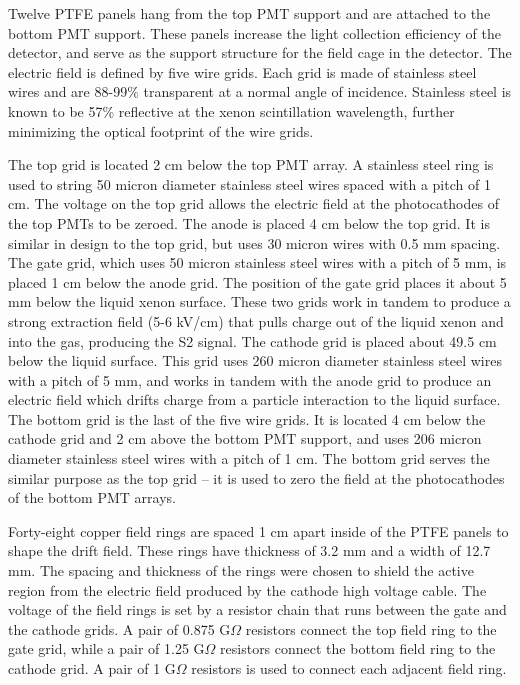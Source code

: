 Twelve PTFE panels hang from the top PMT support and are attached to the bottom PMT support.  These panels increase the light collection efficiency of the detector, and serve as the support structure for the field cage in the detector.  The electric field is defined by five wire grids.  Each grid is made of stainless steel wires and are 88-99\% transparent at a normal angle of incidence.  Stainless steel is known to be 57\% reflective at the xenon scintillation wavelength, further minimizing the optical footprint of the wire grids.

The top grid is located 2 cm below the top PMT array.  A stainless steel ring is used to string 50 micron diameter stainless steel wires spaced with a pitch of 1 cm.  The voltage on the top grid allows the electric field at the photocathodes of the top PMTs to be zeroed.  The anode is placed 4 cm below the top grid.  It is similar in design to the top grid, but uses 30 micron wires with 0.5 mm spacing. The gate grid, which uses 50 micron stainless steel wires with a pitch of 5 mm, is placed 1 cm below the anode grid. The position of the gate grid places it about 5 mm below the liquid xenon surface.   These two grids work in tandem to produce a strong extraction field (5-6 kV/cm) that pulls charge out of the liquid xenon and into the gas, producing the S2 signal. The cathode grid is placed about 49.5 cm below the liquid surface. This grid uses 260 micron diameter stainless steel wires with a pitch of 5 mm, and works in tandem with the anode grid to produce an electric field which drifts charge from a particle interaction to the liquid surface.  The bottom grid is the last of the five wire grids.  It is located 4 cm below the cathode grid and 2 cm above the bottom PMT support, and uses 206 micron diameter stainless steel wires with a pitch of 1 cm.  The bottom grid serves the similar purpose as the top grid – it is used to zero the field at the photocathodes of the bottom PMT arrays.

Forty-eight copper field rings are spaced 1 cm apart inside of the PTFE panels to shape the drift field. These rings have thickness of 3.2 mm and a width of 12.7 mm.  The spacing and thickness of the rings were chosen to shield the active region from the electric field produced by the cathode high voltage cable.  The voltage of the field rings is set by a resistor chain that runs between the gate and the cathode grids.  A pair of  0.875 G$\Omega$ resistors connect the top field ring to the gate grid, while a pair of 1.25 G$\Omega$ resistors connect the bottom field ring to the cathode grid.  A pair of 1 G$\Omega$ resistors is used to connect each adjacent field ring.


